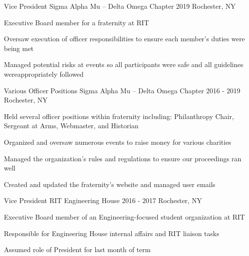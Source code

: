 
\begin{cvexperiences}
	\cvexperience
		{Vice President}
		{Sigma Alpha Mu -- Delta Omega Chapter}
		{2019}
		{Rochester, NY}
		{
			\begin{cvitems}
			\item {Executive Board member for a fraternity at RIT}
			\item {Oversaw execution of officer responsibilities to ensure each member's duties were being met}
			\item {Managed potential risks at events so all participants were safe and all guidelines were\linebreak appropriately followed}
			\end{cvitems}
		}

	\cvexperience
		{Various Officer Positions}
		{Sigma Alpha Mu -- Delta Omega Chapter}
		{2016 - 2019}
		{Rochester, NY}
		{
			\begin{cvitems}
			\item {Held several officer positions within fraternity including: Philanthropy Chair, Sergeant at Arms, Webmaster, and Historian}
			\item {Organized and oversaw numerous events to raise money for various charities}
			\item {Managed the organization's rules and regulations to ensure our proceedings ran well}
			\item {Created and updated the fraternity's website and managed user emails}
			\end{cvitems}
		}

	\cvexperience
		{Vice President}
		{RIT Engineering House}
		{2016 - 2017}
		{Rochester, NY}
		{
			\begin{cvitems}
			\item {Executive Board member of an Engineering-focused student organization at RIT}
			\item {Responsible for Engineering House internal affairs and RIT liaison tasks}
			\item {Assumed role of President for last month of term}
			\end{cvitems}
		}

\end{cvexperiences}
